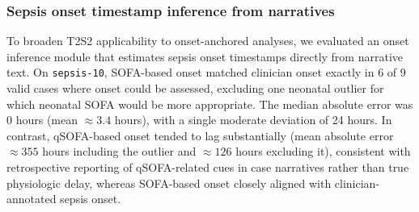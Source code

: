 \documentclass[pmlr,twocolumn,10pt]{jmlr} %
\begin{document}

\subsubsection{Sepsis onset timestamp inference from narratives}
\label{sec:onset_results}

To broaden T2S2 applicability to onset-anchored analyses, we evaluated an onset inference module that estimates sepsis onset timestamps directly from narrative text.
On \texttt{sepsis-10}, SOFA-based onset matched clinician onset exactly in 6 of 9 valid cases where onset could be assessed, excluding one neonatal outlier for which neonatal SOFA would be more appropriate.
The median absolute error was 0 hours (mean $\approx 3.4$ hours), with a single moderate deviation of 24 hours.
In contrast, qSOFA-based onset tended to lag substantially (mean absolute error $\approx 355$ hours including the outlier and $\approx 126$ hours excluding it), consistent with retrospective reporting of qSOFA-related cues in case narratives rather than true physiologic delay, whereas SOFA-based onset closely aligned with clinician-annotated sepsis onset.

\end{document}
